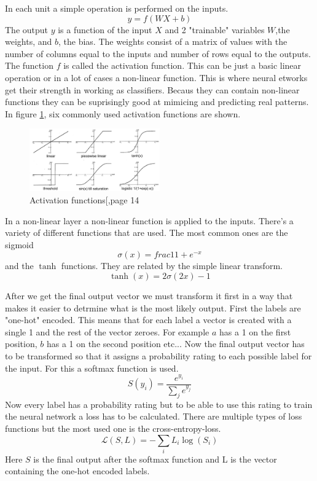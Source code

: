\documentclass[a4paper]{article}
\begin{document}
In each unit a simple operation is performed on the inputs. 
\begin{equation}
y = \mathit{f}(WX + b)
\end{equation}
The output $y$ is a function of the input $X$ and 2 "trainable" variables $W$,the weights, and $b$, the bias. The weights consist of a matrix of values with the number of columns equal to the inputs and number of rows equal to the outputs. The function $\mathit{f}$ is called the activation function. This can be just a basic linear operation or in a lot of cases a non-linear function. This is where neural etworks get their strength in working as classifiers. Becaus they can contain non-linear functions they can be suprisingly good at mimicing and predicting real patterns. In figure \ref{fig:graves}, six commonly used activation functions are shown.


\begin{figure}
  \centering
      \includegraphics[width=0.5\textwidth]{test.png}
  \caption{Activation functions[\cite{Graves},page 14}
  \label{fig:graves}
\end{figure}

In a non-linear layer a non-linear function is applied to the inputs. There's a variety of different functions that are used. The most common ones are the sigmoid 
\begin{equation}
\sigma(x) = frac{1}{1+e^{-x}}
\end{equation}
 and the $\tanh$ functions. They are related by the simple linear transform.
\begin{equation}
\tanh(x) = 2\sigma(2x)-1
\end{equation}

After we get the final output vector we must transform it first in a way that makes it easier to detrmine what is the most likely output. First the labels are "one-hot" encoded. This means that for each label a vector is created with a single 1 and the rest of the vector zeroes. For example $a$ has a 1 on the first position, $b$ has a 1 on the second position etc... Now the final output vector has to be transformed so that it assigns a probability rating to each possible label for the input. For this a softmax function is used.
\begin{equation}
S(y_i) = \frac{e^{y_i}}{\sum\limits_j e^{y_j}}
\end{equation}
Now every label has a probability rating but to be able to use this rating to train the neural network a loss has to be calculated. There are multiple types of loss functions but the most used one is the cross-entropy-loss. 
\begin{equation}
\mathcal{L} (S,L) = -\sum\limits_i L_i\log(S_i)
\end{equation}
Here $S$ is the final output after the softmax function and L is the vector containing the one-hot encoded labels. 
\end{document}
